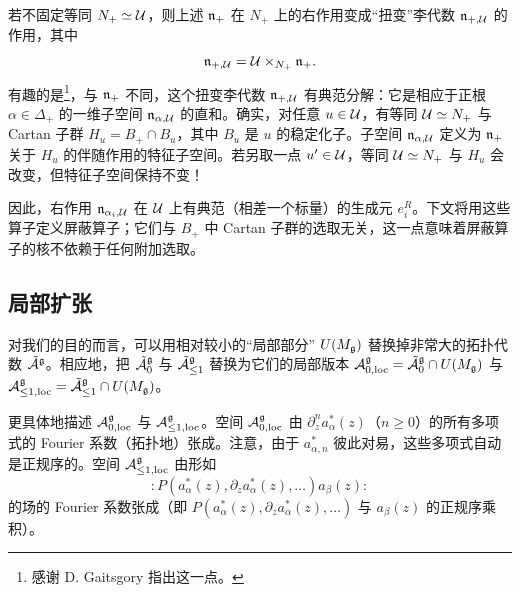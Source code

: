 若不固定等同 $N_+\simeq\mathcal{U}$，则上述 $\mathfrak{n}_+$ 在 $N_+$ 上的右作用变成“扭变”李代数 $\mathfrak{n}_{+,\mathcal{U}}$ 的作用，其中
\[
\mathfrak{n}_{+,\mathcal{U}} = \mathcal{U}\times_{N_+}\mathfrak{n}_+.
\]
有趣的是\footnote{感谢 D. Gaitsgory 指出这一点。}，与 $\mathfrak{n}_+$ 不同，这个扭变李代数 $\mathfrak{n}_{+,\mathcal{U}}$ 有典范分解：它是相应于正根 $\alpha\in\Delta_+$ 的一维子空间 $\mathfrak{n}_{\alpha,\mathcal{U}}$ 的直和。确实，对任意 $u\in\mathcal{U}$，有等同 $\mathcal{U}\simeq N_+$ 与 Cartan 子群 $H_u = B_+\cap B_u$，其中 $B_u$ 是 $u$ 的稳定化子。子空间 $\mathfrak{n}_{\alpha,\mathcal{U}}$ 定义为 $\mathfrak{n}_+$ 关于 $H_u$ 的伴随作用的特征子空间。若另取一点 $u'\in\mathcal{U}$，等同 $\mathcal{U}\simeq N_+$ 与 $H_u$ 会改变，但特征子空间保持不变！

因此，右作用 $\mathfrak{n}_{\alpha_i,\mathcal{U}}$ 在 $\mathcal{U}$ 上有典范（相差一个标量）的生成元 $e_i^R$。下文将用这些算子定义屏蔽算子；它们与 $B_+$ 中 Cartan 子群的选取无关，这一点意味着屏蔽算子的核不依赖于任何附加选取。


\subsection{局部扩张}

对我们的目的而言，可以用相对较小的“局部部分” $U(M_{\mathfrak{g}})$ 替换掉非常大的拓扑代数 $\tilde{\mathcal{A}}^{\mathfrak{g}}$。相应地，把 $\tilde{\mathcal{A}}^{\mathfrak{g}}_0$ 与 $\tilde{\mathcal{A}}^{\mathfrak{g}}_{\le1}$ 替换为它们的局部版本 $\mathcal{A}^{\mathfrak{g}}_{0,\mathrm{loc}} = \tilde{\mathcal{A}}^{\mathfrak{g}}_0\cap U(M_{\mathfrak{g}})$ 与 $\mathcal{A}^{\mathfrak{g}}_{\le1,\mathrm{loc}} = \tilde{\mathcal{A}}^{\mathfrak{g}}_{\le1}\cap U(M_{\mathfrak{g}})$。

更具体地描述 $\mathcal{A}^{\mathfrak{g}}_{0,\mathrm{loc}}$ 与 $\mathcal{A}^{\mathfrak{g}}_{\le1,\mathrm{loc}}$。空间 $\mathcal{A}^{\mathfrak{g}}_{0,\mathrm{loc}}$ 由 $\partial_z^n a^*_\alpha(z)$（$n\ge 0$）的所有多项式的 Fourier 系数（拓扑地）张成。注意，由于 $a^*_{\alpha,n}$ 彼此对易，这些多项式自动是正规序的。空间 $\mathcal{A}^{\mathfrak{g}}_{\le1,\mathrm{loc}}$ 由形如
\[
{:}P(a^*_\alpha(z),\partial_z a^*_\alpha(z),\dots)a_\beta(z){:}
\]
的场的 Fourier 系数张成（即 $P(a^*_\alpha(z),\partial_z a^*_\alpha(z),\dots)$ 与 $a_\beta(z)$ 的正规序乘积）。

